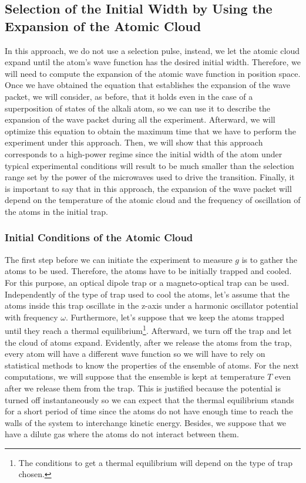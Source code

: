 \documentclass{article}
\begin{document}
\subsection{Selection of the Initial Width by Using the Expansion of the Atomic Cloud}
In this approach, we do not use a selection pulse, instead, we let the atomic cloud expand until the atom's wave function has the desired initial width. Therefore, we will need to compute the expansion of the atomic wave function in position space. Once we have obtained the equation that establishes the expansion of the wave packet, we will consider, as before, that it holds even in the case of a superposition of states of the alkali atom, so we can use it to describe the expansion of the wave packet during all the experiment. Afterward, we will optimize this equation to obtain the maximum time that we have to perform the experiment under this approach. Then, we will show that this approach corresponds to a high-power regime since the initial width of the atom under typical experimental conditions will result to be much smaller than the selection range set by the power of the microwaves used to drive the transition. Finally, it is important to say that in this approach, the expansion of the wave packet will depend on the temperature of the atomic cloud and the frequency of oscillation of the atoms in the initial trap.

\subsubsection{Initial Conditions of the Atomic Cloud}
The first step before we can initiate the experiment to measure $g$ is to gather the atoms to be used. Therefore, the atoms have to be initially trapped and cooled. For this purpose, an optical dipole trap or a magneto-optical trap can be used. Independently of the type of trap used to cool the atoms, let's assume that the atoms inside this trap oscillate in the z-axis under a harmonic oscillator potential with frequency $\omega$. Furthermore, let's suppose that we keep the atoms trapped until they reach a thermal equilibrium\footnote{The conditions to get a thermal equilibrium will depend on the type of trap chosen.}. Afterward, we turn off the trap and let the cloud of atoms expand. Evidently, after we release the atoms from the trap, every atom will have a different wave function so we will have to rely on statistical methods to know the properties of the ensemble of atoms. For the next computations, we will suppose that the ensemble is kept at temperature $T$ even after we release them from the trap. This is justified because the potential is turned off instantaneously so we can expect that the thermal equilibrium stands for a short period of time since the atoms do not have enough time to reach the walls of the system to interchange kinetic energy. Besides, we suppose that we have a dilute gas where the atoms do not interact between them.
\end{document}
